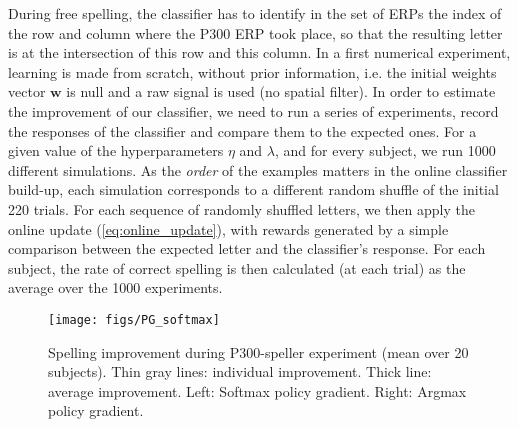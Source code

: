 \documentclass[conference]{IEEEtran}
\begin{document}
During free spelling, the classifier has to identify in the set of ERPs the index of the row and column where the P300 ERP
took place, so that the resulting letter is at the intersection of this row and this column. 
In a first numerical experiment, learning is made from scratch, without prior information,
i.e. the initial weights vector $\boldsymbol{w}$ is null
and a raw signal is used (no spatial filter).
In order to estimate the improvement of our classifier, we need to run a series of experiments,
record the responses of the classifier
and compare them to the expected ones. 
For a given value of the hyperparameters $\eta$ and $\lambda$, and for every subject, we run 1000 different simulations.
As the \emph{order} of the examples matters in the online classifier build-up,
each simulation corresponds to a different random shuffle of the initial 220 trials.
For each sequence of randomly shuffled letters, we then apply the 
online update (\ref{eq:online_update}), with rewards generated by a simple comparison between the expected
letter %
and the classifier's response.  
For each subject, the rate of correct spelling is then calculated
(at each trial) as the average over the 1000 experiments.

\begin{figure}
\centerline{
 \texttt{[image: figs/PG\_softmax]}
}
\caption{Spelling improvement during P300-speller experiment (mean over 20 subjects). 
Thin gray lines: individual improvement. Thick line: average improvement. 
Left: Softmax policy gradient. Right: Argmax policy gradient. 
}
\label{fig:PG_ref}
\end{figure}
\end{document}
